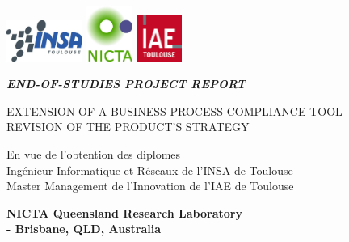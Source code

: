 \documentclass[10pt]{report}
\begin{document}
\setlength{\parindent}{1em}
\def\labelitemi{--} %

\begin{titlepage}

\begin{center}

\includegraphics[width=2.5cm]{INSA-logo.jpg} \hspace{3cm}
\includegraphics[width=1.5cm]{NICTA-logo.jpg}\hspace{4cm}
\includegraphics[width=1.5cm]{IAE-logo.jpg} 

\vspace{3cm}
\textsc{\LARGE \textit{\textbf{\uppercase{End-of-studies project report}}}}
\vspace{1.5cm}

\begin{framed}
\LARGE \uppercase{Extension of a Business Process Compliance tool\\Revision of the Product's Strategy}
\end{framed}

\vspace{1cm}
\large En vue de l'obtention des diplomes \\
Ingénieur Informatique et Réseaux de l'INSA de Toulouse\\
Master Management de l'Innovation de l'IAE de Toulouse

\end{center}
\vspace{1.5cm}
\begin{flushright}
\textbf{\large  NICTA Queensland Research Laboratory\\ \hspace{.5cm}- Brisbane, QLD, Australia}
\end{flushright}


\end{titlepage}
\end{document}
